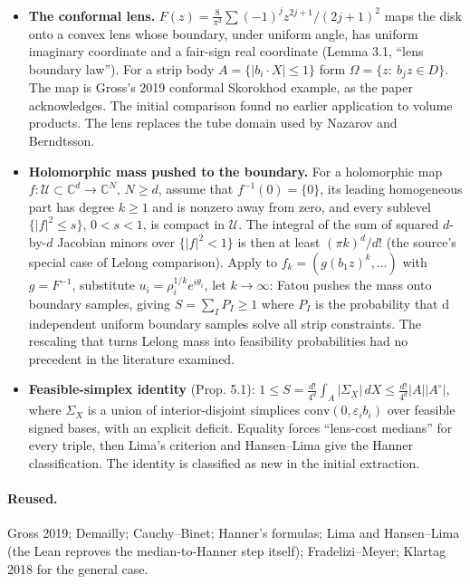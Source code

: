 \documentclass[11pt]{article}
\begin{document}
\begin{itemize}
\item \textbf{The conformal lens.} $F(z)=\frac8{\pi^2}\sum(-1)^jz^{2j+1}/(2j+1)^2$ maps the disk onto a convex lens whose boundary, under uniform angle, has uniform imaginary coordinate and a fair-sign real coordinate (Lemma 3.1, ``lens boundary law''). For a strip body $A=\{|b_i\cdot X|\le1\}$ form $\Omega=\{z:\ b_jz\in D\}$. The map is Gross's 2019 conformal Skorokhod example, as the paper acknowledges. The initial comparison found no earlier application to volume products. The lens replaces the tube domain used by Nazarov and Berndtsson.
\item \textbf{Holomorphic mass pushed to the boundary.} For a holomorphic map $f:\mathcal U\subset\mathbb C^d\to\mathbb C^N$, $N\ge d$, assume that $f^{-1}(0)=\{0\}$, its leading homogeneous part has degree $k\ge1$ and is nonzero away from zero, and every sublevel $\{|f|^2\le s\}$, $0<s<1$, is compact in $\mathcal U$. The integral of the sum of squared $d$-by-$d$ Jacobian minors over $\{|f|^2<1\}$ is then at least $(\pi k)^d/d!$ (the source's special case of Lelong comparison). Apply to $f_k=(g(b_1z)^k,\dots)$ with $g=F^{-1}$, substitute $u_i=\rho_i^{1/k}e^{i\theta_i}$, let $k\to\infty$: Fatou pushes the mass onto boundary samples, giving $S=\sum_IP_I\ge1$ where $P_I$ is the probability that d independent uniform boundary samples solve all strip constraints. The rescaling that turns Lelong mass into feasibility probabilities had no precedent in the literature examined.
\item \textbf{Feasible-simplex identity} (Prop. 5.1): $1\le S=\frac{d!}{4^d}\int_A|\Sigma_X|\,dX\le\frac{d!}{4^d}|A||A^\circ|$, where $\Sigma_X$ is a union of interior-disjoint simplices $\mathrm{conv}(0,\varepsilon_ib_i)$ over feasible signed bases, with an explicit deficit. Equality forces ``lens-cost medians'' for every triple, then Lima's criterion and Hansen--Lima give the Hanner classification. The identity is classified as new in the initial extraction.
\end{itemize}

\paragraph{Reused.}

Gross 2019; Demailly; Cauchy--Binet; Hanner's formulas; Lima and Hansen--Lima (the Lean reproves the median-to-Hanner step itself); Fradelizi--Meyer; Klartag 2018 for the general case.
\end{document}
